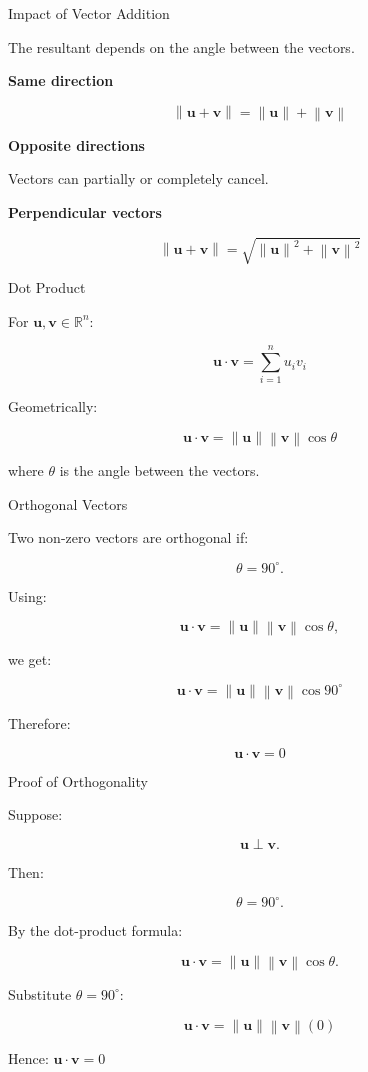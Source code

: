 \documentclass[aspectratio=169,11pt]{beamer}
\newcommand{\R}{\mathbb{R}}
\newcommand{\norm}[1]{\left\lVert #1\right\rVert}
\begin{document}
\begin{frame}{Impact of Vector Addition}

The resultant depends on the angle between the vectors.

\textbf{Same direction}

\[
\norm{\mathbf u+\mathbf v}
=
\norm{\mathbf u}+\norm{\mathbf v}
\]

\textbf{Opposite directions}

Vectors can partially or completely cancel.

\textbf{Perpendicular vectors}

\[
\norm{\mathbf u+\mathbf v}
=
\sqrt{
\norm{\mathbf u}^2+
\norm{\mathbf v}^2
}
\]

\end{frame}

\begin{frame}{Dot Product}

For $\mathbf u,\mathbf v\in\R^n$:

\[
\boxed{
\mathbf u\cdot\mathbf v
=
\sum_{i=1}^{n}u_iv_i
}
\]

Geometrically:

\[
\boxed{
\mathbf u\cdot\mathbf v
=
\norm{\mathbf u}
\norm{\mathbf v}
\cos\theta
}
\]

where $\theta$ is the angle between the vectors.

\end{frame}

\begin{frame}{Orthogonal Vectors}

Two non-zero vectors are orthogonal if:

\[
\theta=90^\circ.
\]

Using:

\[
\mathbf u\cdot\mathbf v
=
\norm{\mathbf u}
\norm{\mathbf v}
\cos\theta,
\]

we get:

\[
\mathbf u\cdot\mathbf v
=
\norm{\mathbf u}
\norm{\mathbf v}
\cos90^\circ
\]

Therefore:

\[
\boxed{
\mathbf u\cdot\mathbf v=0
}
\]

\end{frame}

\begin{frame}{Proof of Orthogonality}

Suppose:

\[
\mathbf u\perp\mathbf v.
\]

Then:

\[
\theta=90^\circ.
\]

By the dot-product formula:

\[
\mathbf u\cdot\mathbf v
=
\norm{\mathbf u}
\norm{\mathbf v}
\cos\theta.
\]

Substitute $\theta=90^\circ$:

\[
\mathbf u\cdot\mathbf v
=
\norm{\mathbf u}
\norm{\mathbf v}(0)
\]

Hence: $\boxed{
\mathbf u\cdot\mathbf v=0
}$

\end{frame}
\end{document}

